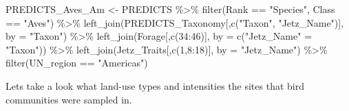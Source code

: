 \documentclass[
]{article}
\newenvironment{Shaded}{\begin{snugshade}}{\end{snugshade}}
\newcommand{\AttributeTok}[1]{\textcolor[rgb]{0.77,0.63,0.00}{#1}}
\newcommand{\DecValTok}[1]{\textcolor[rgb]{0.00,0.00,0.81}{#1}}
\newcommand{\FunctionTok}[1]{\textcolor[rgb]{0.00,0.00,0.00}{#1}}
\newcommand{\NormalTok}[1]{#1}
\newcommand{\OtherTok}[1]{\textcolor[rgb]{0.56,0.35,0.01}{#1}}
\newcommand{\SpecialCharTok}[1]{\textcolor[rgb]{0.00,0.00,0.00}{#1}}
\newcommand{\StringTok}[1]{\textcolor[rgb]{0.31,0.60,0.02}{#1}}
\begin{document}
\begin{Shaded}
\begin{Highlighting}[]
\NormalTok{PREDICTS\_Aves\_Am }\OtherTok{\textless{}{-}}\NormalTok{ PREDICTS }\SpecialCharTok{\%\textgreater{}\%} \FunctionTok{filter}\NormalTok{(Rank }\SpecialCharTok{==} \StringTok{"Species"}\NormalTok{, Class }\SpecialCharTok{==} \StringTok{"Aves"}\NormalTok{) }\SpecialCharTok{\%\textgreater{}\%} \FunctionTok{left\_join}\NormalTok{(PREDICTS\_Taxonomy[,}\FunctionTok{c}\NormalTok{(}\StringTok{"Taxon"}\NormalTok{, }\StringTok{"Jetz\_Name"}\NormalTok{)], }\AttributeTok{by =} \StringTok{"Taxon"}\NormalTok{) }\SpecialCharTok{\%\textgreater{}\%}
  \FunctionTok{left\_join}\NormalTok{(Forage[,}\FunctionTok{c}\NormalTok{(}\DecValTok{34}\SpecialCharTok{:}\DecValTok{46}\NormalTok{)], }\AttributeTok{by =} \FunctionTok{c}\NormalTok{(}\StringTok{"Jetz\_Name"} \OtherTok{=} \StringTok{"Taxon"}\NormalTok{)) }\SpecialCharTok{\%\textgreater{}\%}
  \FunctionTok{left\_join}\NormalTok{(Jetz\_Traits[,}\FunctionTok{c}\NormalTok{(}\DecValTok{1}\NormalTok{,}\DecValTok{8}\SpecialCharTok{:}\DecValTok{18}\NormalTok{)], }\AttributeTok{by =} \StringTok{"Jetz\_Name"}\NormalTok{) }\SpecialCharTok{\%\textgreater{}\%}
  \FunctionTok{filter}\NormalTok{(UN\_region }\SpecialCharTok{==} \StringTok{"Americas"}\NormalTok{)}
\end{Highlighting}
\end{Shaded}

Lets take a look what land-use types and intensities the sites that bird
communities were sampled in.

\begin{Shaded}
\end{Shaded}
\end{document}
